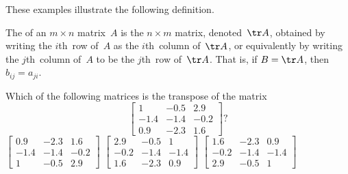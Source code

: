 These examples illustrate the following definition. 
\begin{definition}[transpose] \label{def:mattran}
The  of an \(m\times n\) matrix~\(A\) is the \(n\times m\) matrix, denoted~\(\tr A\), obtained by writing the \(i\)th~row of~\(A\) as the \(i\)th~column of~\(\tr A\), or equivalently by writing the \(j\)th~column of~\(A\) to be the \(j\)th~row of~\(\tr A\).
That is, if \(B=\tr A\), then \(b_{ij}=a_{ji}\).
\end{definition}



\begin{activity}
Which of the following matrices is the transpose of the matrix
\begin{equation*}
\begin{bmatrix} 1&-0.5&2.9
\\-1.4&-1.4&-0.2
\\0.9&-2.3&1.6 \end{bmatrix}?
\end{equation*}
{\(\begin{bmatrix} 0.9&-2.3&1.6
\\-1.4&-1.4&-0.2
\\1&-0.5&2.9 \end{bmatrix}\)}
{\(\begin{bmatrix} 2.9&-0.5&1
\\-0.2&-1.4&-1.4
\\1.6&-2.3&0.9 \end{bmatrix}\)}
{\(\begin{bmatrix} 1.6&-2.3&0.9
\\-0.2&-1.4&-1.4
\\2.9&-0.5&1 \end{bmatrix}\)}
\end{activity} 




